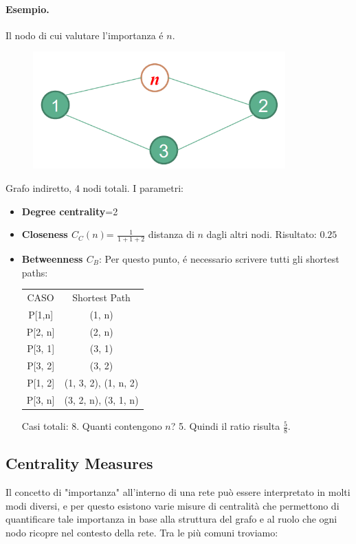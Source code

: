 \paragraph{Esempio.}
Il nodo di cui valutare l'importanza é $n$. 
\begin{figure}[th]
    \centering
    \includegraphics[scale=0.5]{Introduction//img/image.png}
\end{figure}
Grafo indiretto, 4 nodi totali. I parametri:
\begin{itemize}
    \item \textbf{Degree centrality}=2 
    \item \textbf{Closeness $C_C(n)$}= $\frac{1}{1+1+2}$ distanza di $n$ dagli altri nodi. Risultato: $0.25$
    \item \textbf{Betweenness $C_B$}: Per questo punto, é necessario scrivere tutti gli shortest paths:
    \begin{table}[th]
        \centering
        \begin{tabular}{c|c}
            CASO & Shortest Path \\
            P[1,n] & (1, n) \\
            P[2, n] & (2, n) \\
            P[3, 1] & (3, 1) \\
            P[3, 2] & (3, 2) \\
            P[1, 2] & (1, 3, 2), (1, n, 2) \\
            P[3, n] & (3, 2, n), (3, 1, n) \\
        \end{tabular}
    \end{table}
    Casi totali: 8. Quanti contengono $n$? 5. Quindi il ratio risulta $\frac{5}{8}$. 
\end{itemize}

\subsection{Centrality Measures}
Il concetto di "importanza" all'interno di una rete può essere interpretato in molti modi diversi, e per questo esistono varie misure di centralità che permettono di quantificare tale importanza in base alla struttura del grafo e al ruolo che ogni nodo ricopre nel contesto della rete. Tra le più comuni troviamo:

